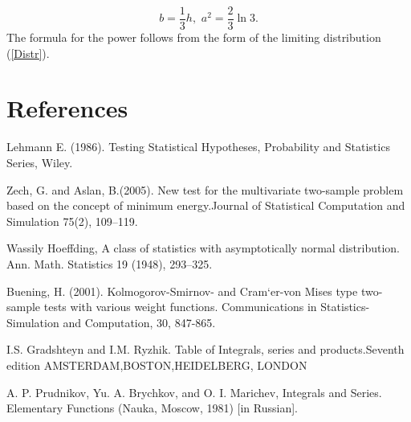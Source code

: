 \documentclass[final,11pt,3p]{elsarticle}
\begin{document}
$$
b=\frac{1}{3} h,\,\,a^2=\frac{2}{3}\ln 3.
$$
The formula for the power follows from the form of the limiting distribution  (\ref{Distr}).





\section{References}
 Lehmann E. (1986).  Testing  Statistical  Hypotheses,  Probability  and  Statistics  Series,  Wiley.

Zech,  G. and Aslan, B.(2005).   New test for the multivariate two-sample problem based on the concept of minimum energy.Journal of Statistical Computation and Simulation 75(2), 109–119.

 Wassily Hoeffding, A class of statistics with asymptotically normal distribution.
Ann. Math. Statistics 19 (1948), 293–325.

Buening, H. (2001). Kolmogorov-Smirnov- and Cram`er-von Mises type two-sample tests with various weight functions. Communications in Statistics-
Simulation and Computation, 30, 847-865.

I.S. Gradshteyn and I.M. Ryzhik. Table of Integrals, series and products.Seventh edition AMSTERDAM,BOSTON,HEIDELBERG, LONDON



A. P. Prudnikov, Yu. A. Brychkov, and O. I. Marichev, Integrals and Series. Elementary Functions (Nauka, Moscow, 1981) [in Russian].



% 









\end{document}
